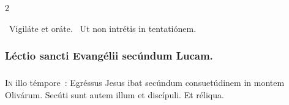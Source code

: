 \documentclass[9pt,twoside]{extarticle}
\begin{document}
\begin{multicols}{2}
%
%
%
%
%
%
%
%
%
%
%
%
%
%
%
%
%
%
%

\begin{tightlist}{}
\item {}~Vigiláte et oráte. ~Ut non intrétis in tentatiónem.
\end{tightlist}

\subsubsection*{\center Léctio sancti Evangélii secúndum Lucam.}
\subsubsection*{\center {}}
\lettrine{I}n illo témpore~: Egréssus Jesus ibat secúndum consuetúdinem in montem Olivárum. Secúti sunt autem illum et discípuli. Et réliqua.


\end{multicols}
\end{document}

